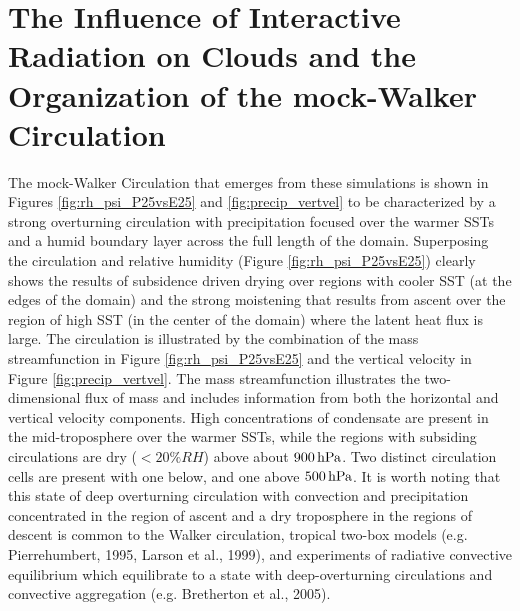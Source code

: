 \documentclass[draft]{agujournal2019}
\begin{document}
\section{The Influence of Interactive Radiation on Clouds and the Organization of the mock-Walker Circulation}


The mock-Walker Circulation that emerges from these simulations is shown in Figures \ref{fig:rh_psi_P25vsE25} and 
\ref{fig:precip_vertvel} to be characterized by a strong overturning circulation with precipitation focused over the warmer 
SSTs and a humid boundary layer across the full length of the domain.    Superposing the circulation and relative 
humidity (Figure \ref{fig:rh_psi_P25vsE25}) clearly shows the results of subsidence driven 
drying over regions with cooler SST (at the edges of the domain) and the strong moistening that results from ascent over the region of high
SST (in the center of the domain) where the latent heat flux is large.   The circulation is illustrated by the combination of 
the mass streamfunction in Figure \ref{fig:rh_psi_P25vsE25} and the vertical velocity in Figure \ref{fig:precip_vertvel}.   
The mass streamfunction illustrates the 
two-dimensional flux of mass and includes information from both the horizontal and vertical velocity components.
High concentrations of condensate are present in the mid-troposphere over the warmer SSTs, while the regions with subsiding 
circulations are dry ($< 20\% RH$) above about $900\, \rm{hPa}$.  
Two distinct circulation cells are present with one below, and one above $500 \, \rm{hPa}$.   
It is worth noting that this state of deep overturning circulation with convection 
and precipitation concentrated in the region of ascent and a dry troposphere in the regions of descent is common
to the Walker circulation, tropical two-box models (e.g. Pierrehumbert, 1995, Larson et al., 1999), and 
experiments of radiative convective equilibrium which equilibrate to a state with deep-overturning circulations 
and convective aggregation (e.g. Bretherton et al., 2005).
\end{document}
